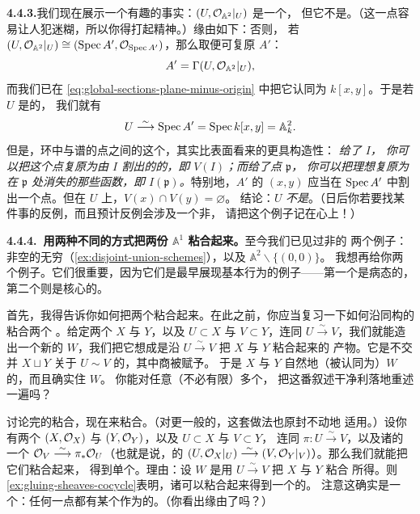\textbf{4.4.3.}\quad 我们现在展示一个有趣的事实：$(U,\mathcal{O}_{\mathbb{A}^2}|_U)$ 是一个\trScheme，%
但它不是\trAffineScheme。（这一点容易让人犯迷糊，所以你得打起精神。）缘由如下：否则，%
若 $(U,\mathcal{O}_{\mathbb{A}^2}|_U)\cong(\operatorname{Spec} A',\mathcal{O}_{\operatorname{Spec} A'})$，那么取\trGlobalSections{}便可复原 $A'$：
\[
A'=\Gamma(U,\mathcal{O}_{\mathbb{A}^2}|_U),
\]
而我们已在 \eqref{eq:global-sections-plane-minus-origin} 中把它认同为 $k[x,y]$。于是若 $U$ 是\trAffine{}的，%
我们就有\trIsomorphism
\[
U\overset{\sim}{\longrightarrow}\operatorname{Spec} A'=\operatorname{Spec} k[x,y]=\mathbb{A}^2_k.
\]
但是，环中\trPrimeIdeal{}与谱的点之间的这个\trBijection，其实比表面看来的更具构造性：%
\emph{给了\trPrimeIdeal{} $I$，%
你可以把这个点复原为由 $I$ 割出的\trClosedSubset{}的\trGenericPoint，即 $V(I)$；而给了点 $\mathfrak{p}$，%
你可以把理想复原为在 $\mathfrak{p}$ 处消失的那些函数，即 $I(\mathfrak{p})$。}特别地，$A'$ 的%
\trPrimeIdeal{} $(x,y)$ 应当在 $\operatorname{Spec} A'$ 中割出一个点。但在 $U$ 上，$V(x)\cap V(y)=\varnothing$。%
结论：$U$ \emph{不是}\trAffineScheme。（日后你若要找某件事的反例，而且预计反例会涉及一个非\trAffineScheme，%
请把这个例子记在心上！）

\textbf{4.4.4.\ 用两种不同的方式把两份 $\mathbb{A}^1$ 粘合起来。}\quad 至今我们已见过非\trAffineScheme{}的%
两个例子：非空\trScheme{}的无穷\trDisjointUnion（\cref{ex:disjoint-union-schemes}），以及 $\mathbb{A}^2\smallsetminus\{(0,0)\}$。%
我想再给你两个例子。它们很重要，因为它们是最早展现基本行为的例子——第一个是病态的，第二个则是核心的。

首先，我得告诉你如何把两个\trScheme{}粘合起来。在此之前，你应当复习一下如何沿同构的\trOpenSet{}粘合两个%
\trTopologicalSpace。给定两个\trTopologicalSpace{} $X$ 与 $Y$，以及\trOpenSubset{} $U\subset X$ 与%
$V\subset Y$，连同\trHomeomorphism{} $U\overset{\sim}{\longrightarrow}V$，我们就能造出一个新的%
\trTopologicalSpace{} $W$，我们把它想成是沿 $U\overset{\sim}{\longrightarrow}V$ 把 $X$ 与 $Y$ 粘合起来的%
产物。它是不交并 $X\sqcup Y$ 关于\trEquivalenceRelation{} $U\sim V$ 的\trQuotient，其中商被赋予\trQuotientTopology{}。%
于是 $X$ 与 $Y$ 自然地（被认同为）$W$ 的\trOpenSubset，而且确实\trCover{}住 $W$。%
你能对任意（不必有限）多个\trTopologicalSpace，%
把这番叙述干净利落地重述一遍吗？

讨论完\trTopologicalSpace{}的粘合，现在来粘合\trScheme。（对更一般的\trRingedSpace，这套做法也原封不动地%
适用。）设你有两个\trScheme{} $(X,\mathcal{O}_X)$ 与 $(Y,\mathcal{O}_Y)$，以及\trOpenSubset{} $U\subset X$ 与 $V\subset Y$，%
连同\trHomeomorphism{} $\pi\colon U\overset{\sim}{\longrightarrow}V$，以及诸\trStructureSheaf{}的一个%
\trIsomorphism{} $\mathcal{O}_V\overset{\sim}{\longrightarrow}\pi_*\mathcal{O}_U$（也就是说，\emph{\trScheme}的%
\trIsomorphism{} $(U,\mathcal{O}_X|_U)\overset{\sim}{\longrightarrow}(V,\mathcal{O}_Y|_V)$）。那么我们就能把它们粘合起来，%
得到单个\trScheme。理由：设 $W$ 是用\trIsomorphism{} $U\overset{\sim}{\longrightarrow}V$ 把 $X$ 与 $Y$ 粘合%
所得。则\cref{ex:gluing-sheaves-cocycle}表明，诸\trStructureSheaf{}可以粘合起来得到一个\trRing{}的\trSheaf。%
注意这确实是一个\trScheme：任何一点都有某个作为\trAffineScheme{}的\trNeighborhood。（你看出缘由了吗？）

